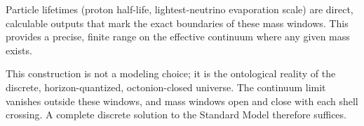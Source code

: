 \documentclass[12pt,a4paper]{article}
\begin{document}
Particle lifetimes (proton half-life, lightest-neutrino evaporation scale) are direct, calculable outputs that mark the exact boundaries of these mass windows. This provides a precise, finite range on the effective continuum where any given mass exists.

This construction is not a modeling choice; it is the ontological reality of the discrete, horizon-quantized, octonion-closed universe. The continuum limit vanishes outside these windows, and mass windows open and close with each shell crossing. A complete discrete solution to the Standard Model therefore suffices.

\renewcommand{\bibsection}{\section*{References}}


\end{document}
